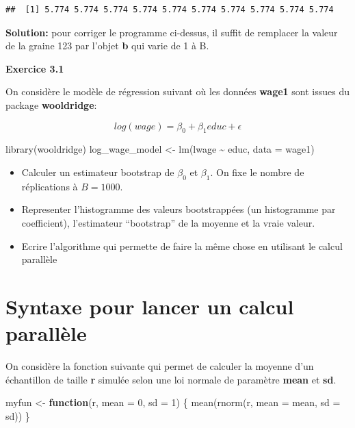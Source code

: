 \documentclass[
]{book}
\newenvironment{Shaded}{\begin{snugshade}}{\end{snugshade}}
\newcommand{\AttributeTok}[1]{\textcolor[rgb]{0.77,0.63,0.00}{#1}}
\newcommand{\ControlFlowTok}[1]{\textcolor[rgb]{0.13,0.29,0.53}{\textbf{#1}}}
\newcommand{\DecValTok}[1]{\textcolor[rgb]{0.00,0.00,0.81}{#1}}
\newcommand{\FunctionTok}[1]{\textcolor[rgb]{0.00,0.00,0.00}{#1}}
\newcommand{\NormalTok}[1]{#1}
\newcommand{\OtherTok}[1]{\textcolor[rgb]{0.56,0.35,0.01}{#1}}
\newcommand{\SpecialCharTok}[1]{\textcolor[rgb]{0.00,0.00,0.00}{#1}}
\theoremstyle{definition}
\theoremstyle{definition}
\theoremstyle{definition}
\theoremstyle{definition}
\theoremstyle{remark}
\begin{document}
\begin{verbatim}
##  [1] 5.774 5.774 5.774 5.774 5.774 5.774 5.774 5.774 5.774 5.774
\end{verbatim}

\textbf{Solution:} pour corriger le programme ci-dessus, il suffit de remplacer la valeur de la graine 123 par l'objet \textbf{b} qui varie de 1 à B.

\textbf{Exercice 3.1}

On considère le modèle de régression suivant où les données \textbf{wage1} sont issues du package \textbf{wooldridge}:

\[log(wage)=\beta_0+\beta_1 educ + \epsilon\]

\begin{Shaded}
\begin{Highlighting}[]
\FunctionTok{library}\NormalTok{(wooldridge)}
\NormalTok{log\_wage\_model }\OtherTok{\textless{}{-}} \FunctionTok{lm}\NormalTok{(lwage }\SpecialCharTok{\textasciitilde{}}\NormalTok{ educ, }\AttributeTok{data =}\NormalTok{ wage1)}
\end{Highlighting}
\end{Shaded}

\begin{itemize}
\item
  Calculer un estimateur bootstrap de \(\beta_0\) et \(\beta_1\). On fixe le nombre de réplications à \(B=1000\).
\item
  Representer l'histogramme des valeurs bootstrappées (un histogramme par coefficient), l'estimateur ``bootstrap'' de la moyenne et la vraie valeur.
\item
  Ecrire l'algorithme qui permette de faire la même chose en utilisant le calcul parallèle
\end{itemize}

\hypertarget{syntaxe-pour-lancer-un-calcul-paralluxe8le}{%
\section{Syntaxe pour lancer un calcul parallèle}\label{syntaxe-pour-lancer-un-calcul-paralluxe8le}}

On considère la fonction suivante qui permet de calculer la moyenne d'un échantillon de taille \textbf{r} simulée selon une loi normale de paramètre \textbf{mean} et \textbf{sd}.

\begin{Shaded}
\begin{Highlighting}[]
\NormalTok{myfun }\OtherTok{\textless{}{-}} \ControlFlowTok{function}\NormalTok{(r, }\AttributeTok{mean =} \DecValTok{0}\NormalTok{, }\AttributeTok{sd =} \DecValTok{1}\NormalTok{) \{}
  \FunctionTok{mean}\NormalTok{(}\FunctionTok{rnorm}\NormalTok{(r, }\AttributeTok{mean =}\NormalTok{ mean, }\AttributeTok{sd =}\NormalTok{ sd))}
\NormalTok{\}}
\end{Highlighting}
\end{Shaded}
\end{document}
